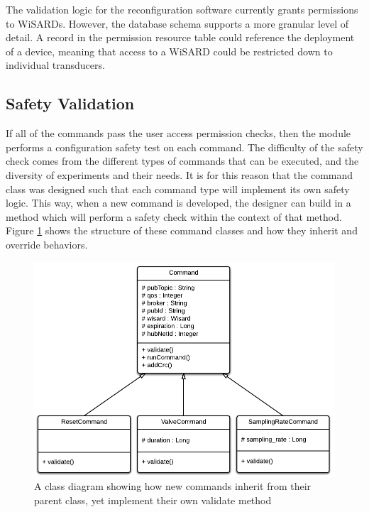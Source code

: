 The validation logic for the reconfiguration software currently grants permissions to WiSARDs. However, the database schema supports a more granular level of detail. A record in the permission resource table could reference the deployment of a device, meaning that access to a WiSARD could be restricted down to individual transducers. 

\subsection{Safety Validation}
 If all of the commands pass the user access permission checks, then the module performs a configuration safety test on each command. The difficulty of the safety check comes from the different types of commands that can be executed, and the diversity of experiments and their needs. It is for this reason that the command class was designed such that each command type will implement its own safety logic. This way, when a new command is developed, the designer can build in a method which will perform a safety check within the context of that method. Figure \ref{fig:cmd_classes} shows the structure of these command classes and how they inherit and override behaviors.
 
\begin{figure}[H]
	\centering
	\includegraphics[width=\textwidth]{figures/command_class_diagram.png}
	\caption{A class diagram showing how new commands inherit from their parent class, yet implement their own validate method}
	\label{fig:cmd_classes}
\end{figure}
 
